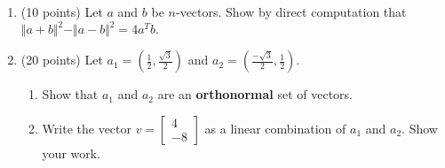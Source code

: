 \documentclass[11pt,fleqn]{article}
\def\vectwo#1#2{\begin{bmatrix}#1\\#2\end{bmatrix}}
\begin{document}
\newpage
\begin{enumerate}

\item (10 points) Let $a$ and $b$ be $n$-vectors. Show by direct computation that $\Vert a+b \Vert^2 - \Vert a-b \Vert^2 = 4a^Tb.$
\vfill


\item (20 points) Let $a_1=( \frac{1}{2}, \frac{\sqrt{3}}{2})$ and $a_2=(\frac{-\sqrt{3}}{2}, \frac{1}{2})$.
	\begin{enumerate}
	\item Show that $a_1$ and $a_2$ are an \textbf{orthonormal} set of vectors.
	\vfill
	\item Write the vector $v=\vectwo{4}{-8}$ as a linear combination of $a_1$ and $a_2.$ Show your work.
	\vfill
	\end{enumerate}
\newpage


\end{enumerate}
\end{document}
